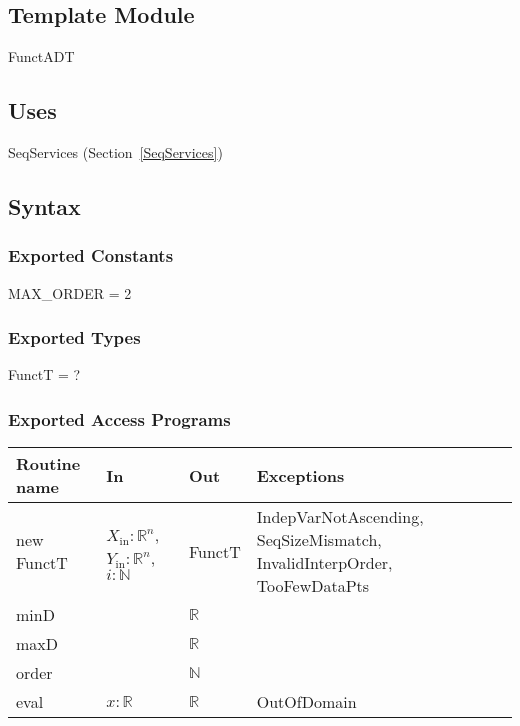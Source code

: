 \documentclass[12pt, titlepage]{article}
\begin{document}
\subsection{Template Module}

FunctADT

\subsection {Uses}

SeqServices (Section~\ref{SeqServices})

\subsection {Syntax}

\subsubsection {Exported Constants}

MAX\_ORDER = 2

\subsubsection {Exported Types}

FunctT = ?

\subsubsection {Exported Access Programs}

\begin{tabular}{| l | l | l | p{5cm} |}
\hline
\textbf{Routine name} & \textbf{In} & \textbf{Out} & \textbf{Exceptions}\\
\hline
new FunctT & $X_\text{in}: \mathbb{R}^n$, $Y_\text{in}: \mathbb{R}^n$, $i: \mathbb{N}$ &
                                                                           FunctT
                                                   &
                                                     IndepVarNotAscending,\newline
                                                     SeqSizeMismatch, \newline
                                                     InvalidInterpOrder,
                                                     \newline TooFewDataPts\\
\hline
minD & ~ & $\mathbb{R}$ & ~\\
\hline
maxD & ~ & $\mathbb{R}$ & ~\\
\hline
order & ~ & $\mathbb{N}$ & ~\\
\hline
eval & $x: \mathbb{R}$ & $\mathbb{R}$ & OutOfDomain\\
\hline

\end{tabular}
\end{document}
